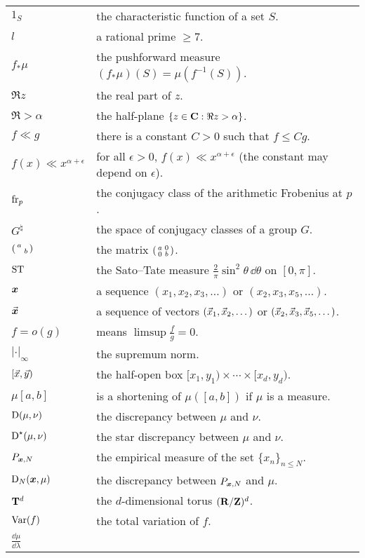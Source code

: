 \documentclass[phd,tocprelim]{cornell}
\begin{document}
\symlist

\begin{tabular}{ll}
$1_S$     
	& the characteristic function of a set $S$. \\
$l$       
	& a rational prime $\geqslant 7$. \\
$f_\ast\mu$
	& the pushforward measure $(f_\ast\mu)(S) = \mu(f^{-1}(S))$. \\
$\Re z$
	& the real part of $z$. \\
$\Re > \alpha$
	& the half-plane $\{z\in \mathbf{C} : \Re z > \alpha\}$. \\
$f \ll g$ 
	& there is a constant $C>0$ such that $f \leqslant C g$. \\
$f(x) \ll x^{\alpha+\epsilon}$ 
	& for all $\epsilon>0$, $f(x) \ll x^{\alpha+\epsilon}$ (the constant may depend on $\epsilon$). \\
$\mathrm{fr}_p$
	& the conjugacy class of the arithmetic Frobenius at $p$. \\
$G^\natural$
	& the space of conjugacy classes of a group $G$. \\
$\left(\begin{smallmatrix} a &  \\  & b \end{smallmatrix}\right)$
	& the matrix $\left(\begin{smallmatrix} a & 0 \\ 0 & b \end{smallmatrix}\right)$. \\
$\mathrm{ST}$
	& the Sato--Tate measure $\frac{2}{\pi} \sin^2\theta\, \dd\theta$ on $[0,\pi]$. \\
${\boldsymbol x}$
	& a sequence $(x_1,x_2,x_3,\dots)$ or $(x_2,x_3,x_5,\dots)$. \\
$\vec{\boldsymbol x}$
	& a sequence of vectors $(\vec{x}_1,\vec{x}_2,\dots)$ or $(\vec{x}_2,\vec{x}_3,\vec{x}_5,\dots)$. \\
$f = o(g)$
	& means $\limsup \frac f g = 0$. \\
$|\cdot|_\infty$
	& the supremum norm. \\
$[\vec{x},\vec{y})$
	& the half-open box $[x_1,y_1) \times \cdots \times [x_d,y_d)$. \\
$\mu[a,b]$
	& is a shortening of $\mu([a,b])$ if $\mu$ is a measure. \\
$\operatorname{D}(\mu,\nu)$
	& the discrepancy between $\mu$ and $\nu$. \\
$\operatorname{D}^\star(\mu,\nu)$
	& the star discrepancy between $\mu$ and $\nu$. \\
$P_{{\boldsymbol x},N}$
	& the empirical measure of the set $\{x_n\}_{n\leqslant N}$. \\
$\operatorname{D}_N({\boldsymbol x},\mu)$
	& the discrepancy between $P_{{\boldsymbol x},N}$ and $\mu$. \\
$\mathbf{T}^d$
	& the $d$-dimensional torus $(\mathbf{R}/\mathbf{Z})^d$. \\
$\operatorname{Var}(f)$
	& the total variation of $f$. \\
$\frac{\dd\mu}{\dd\lambda}$

\end{tabular}
\end{document}
